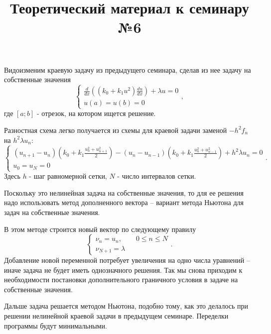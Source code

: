 \documentclass{article}
\title{Теоретический материал к семинару №6}
\date{}
\begin{document}
\maketitle

Видоизменим краевую задачу из предыдущего семинара, сделав из нее задачу на собственные значения
\begin{equation} \label{c6eq1}
	\begin{cases}
		 \displaystyle \frac{d}{dx} \left( \left( k_0 + k_1 u^2 \right) \frac{du}{dx} \right) + \lambda u = 0 \\
		u(a) = u(b) = 0
	\end{cases},
\end{equation}
где $[a; b]$ - отрезок, на котором ищется решение.

Разностная схема легко получается из схемы для краевой задачи заменой $-h^2 f_n$ на $h^2 \lambda u_n$:
\begin{equation} \label{c6eq2}
	\begin{cases}
		\displaystyle \left( u_{n+1} - u_n \right) \left( k_0 + k_1 \frac{u_n^2 + u_{n+1}^2}{2} \right) - \left( u_n - u_{n-1} \right) \left( k_0 + k_1 \frac{u_n^2 + u_{n-1}^2}{2} \right) + h^2 \lambda u_n = 0 \\
		u_0 = u_N = 0
	\end{cases}.
\end{equation}
Здесь $h$ - шаг равномерной сетки, $N$ - число интервалов сетки.

Поскольку это нелинейная задача на собственные значения, то для ее решения надо использовать метод дополненного вектора – вариант метода Ньютона для задач на собственные значения.

В этом методе строится новый вектор   по следующему правилу
\begin{equation} \label{c6eq3}
	\begin{cases}
	\nu_n = u_n, \qquad 0 \leq n \leq N\\
	\nu_{N+1} = \lambda
	\end{cases}.
\end{equation}
Добавление новой переменной потребует увеличения на одно числа уравнений – иначе задача не будет иметь однозначного решения. Так мы снова приходим к необходимости постановки дополнительного граничного условия в задаче на собственные значения.

Дальше задача решается методом Ньютона, подобно тому, как это делалось при решении нелинейной краевой задачи в предыдущем семинаре. Переделки программы будут минимальными.
\end{document}
